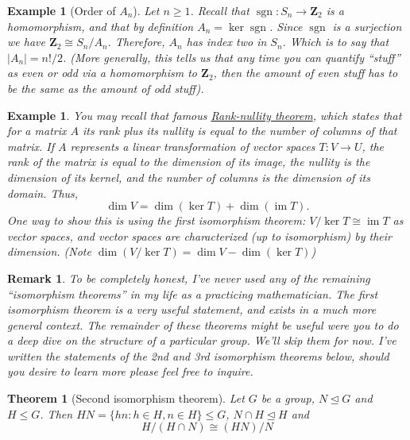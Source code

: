 \documentclass[12pt]{article}
\numberwithin{equation}{subsection}
\newtheorem{thm}[subsection]{Theorem}
\theoremstyle{note}
\newtheorem{example}[subsection]{Example}
\newtheorem{remark}[subsection]{Remark}
\newcommand{\nrml}{\trianglelefteq}
\newcommand{\img}{\operatorname{im}}
\begin{document}
\begin{example}[Order of $A_n$]
	Let $n\geq 1$. Recall that $\operatorname{sgn}\colon S_n\to \mathbf{Z}_2$ is a homomorphism, and that by definition  $A_n=\ker\operatorname{sgn}$. Since $\operatorname{sgn}$ is a surjection we have $\mathbf{Z}_2\cong S_n/A_n$. Therefore, $A_n$ has index two in $S_n$. Which is to say that $|A_n|=n!/2$. (More generally, this tells us that any time you can quantify ``stuff'' as even or odd via a homomorphism to $\mathbf{Z}_2$, then the amount of even stuff has to be the same as the amount of odd stuff). 
\end{example}

\begin{example} You may recall that famous \href{https://en.wikipedia.org/wiki/Rank\%E2\%80\%93nullity_theorem}{\textit{Rank-nullity theorem}}, which states that for a matrix $A$ its rank plus its nullity is equal to the number of columns of that matrix. If $A$ represents a linear transformation of vector spaces $T\colon V\to U$, the rank of the matrix is equal to the dimension of its image, the nullity is the dimension of its kernel, and the number of columns is the dimension of its domain. Thus, \[\dim V=\dim(\ker T)+\dim (\img T).\] One way to show this is using the first isomorphism theorem: $V/\ker T\cong \img T$ as vector spaces, and vector spaces are characterized (up to isomorphism) by their dimension. (Note $\dim (V/\ker T)=\dim V-\dim (\ker T)$)
\end{example} 
{\color{violet}

\begin{remark}	To be completely honest, I've never used any of the remaining ``isomorphism theorems'' in my life as a practicing mathematician. The first isomorphism theorem is a very useful statement, and exists in a much more general context. The remainder of these theorems might be useful were you to do a deep dive on the structure of a particular group. We'll skip them for now. I've written the statements of the 2nd and 3rd isomorphism theorems below, should you desire to learn more please feel free to inquire.
\end{remark}
}
\begin{thm}[Second isomorphism theorem]
Let $G$ be a group, $N\nrml G$ and $H\leq G$. Then $HN=\{hn: h\in H, n\in H\}\leq G$, $N\cap H\nrml H$ and \begin{equation} H/(H\cap N)\cong (HN)/N\end{equation}
\end{thm}
\end{document}
